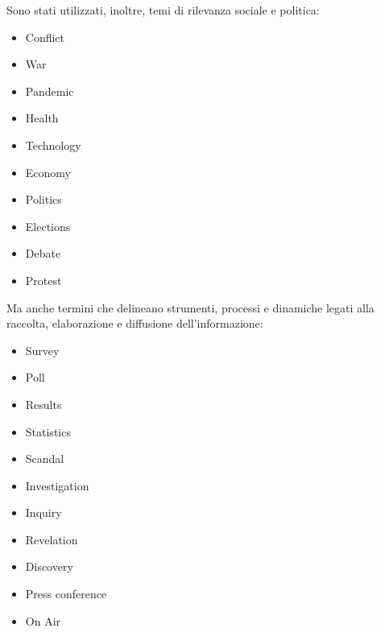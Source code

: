 \documentclass[12pt]{article}
\begin{document}
	Sono stati utilizzati, inoltre, temi di rilevanza sociale e politica:
	\begin{itemize}[label=] 
		\item Conflict
		\item War
		\item Pandemic
		\item Health
		\item Technology
		\item Economy
		\item Politics
		\item Elections
		\item Debate
		\item Protest
	\end{itemize}
	Ma anche termini che delineano strumenti, processi e dinamiche legati alla raccolta, elaborazione e diffusione dell’informazione:
	\begin{itemize}[label=] 
		\item Survey
		\item Poll
		\item Results
		\item Statistics
		\item Scandal
		\item Investigation
		\item Inquiry
		\item Revelation
		\item Discovery
		\item Press conference
		\item On Air
	\end{itemize}
\end{document}
